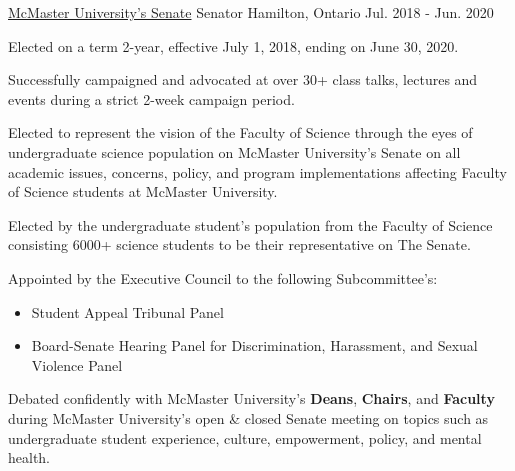 
\begin{cventries}
  \cventry
    {\href{https://secretariat.mcmaster.ca/senate/}{McMaster University's Senate}} %
    {Senator} %
    {Hamilton, Ontario} %
    {Jul. 2018 - Jun. 2020} %
     {\renewcommand{\labelitemii}{\bullet}
      \begin{cvitems}%
         \item {Elected on a term 2-year, effective July 1, 2018, ending on June 30, 2020.}
        \item{Successfully campaigned and advocated at over 30+ class talks, lectures and events during a strict 2-week campaign period.}
        \item {Elected to represent the vision of the Faculty of Science through the eyes of undergraduate science population on McMaster University's Senate on all academic issues, concerns, policy, and program implementations affecting Faculty of Science students at McMaster University.}
        \item{Elected by the undergraduate student's population from the Faculty of Science consisting 6000+ science students to be their representative on The Senate.}
        \item{Appointed by the Executive Council to the following Subcommittee's:}
        \begin{itemize}
            \item {Student Appeal Tribunal Panel}
            \item {Board-Senate Hearing Panel for Discrimination, Harassment, and Sexual Violence Panel}
         \end{itemize}
        \item {Debated confidently with McMaster University's \textbf{Deans}, \textbf{Chairs}, and \textbf{Faculty} during McMaster University's open \& closed Senate meeting on topics such as undergraduate student experience, culture, empowerment, policy, and mental health.}
      \end{cvitems}
    }


\end{cventries}
